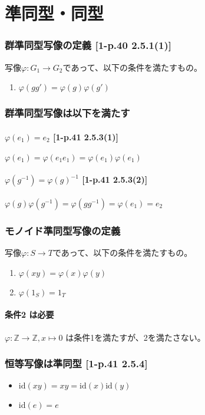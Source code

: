 \documentclass[twocolumn]{jsarticle}
\newcommand{\Z}{\mathbb{Z}}
\newcommand{\id}{\text{id}}
\newcommand{\inv}[1]{#1^{-1}}
\renewcommand{\phi}{\varphi}
\begin{document}
\newpage
\part*{準同型・同型}
\setcounter{section}{0}
\section{群準同型写像の定義 [1-p.40 2.5.1(1)]}
写像\(\phi\colon G_1 \to G_2\)であって、以下の条件を満たすもの。
\begin{enumerate}
    \item \(\phi(gg')=\phi(g)\phi(g')\)
\end{enumerate}

\section{群準同型写像は以下を満たす}
\subsection{\(\phi(e_1)=e_2\) [1-p.41 2.5.3(1)]}
\(\phi(e_1)=\phi(e_1e_1)=\phi(e_1)\phi(e_1)\)
\subsection{\(\phi(\inv{g})=\inv{\phi(g)}\) [1-p.41 2.5.3(2)]}
\(\phi(g)\phi(\inv{g})=\phi(g\inv{g})=\phi(e_1)=e_2\)

\section{モノイド準同型写像の定義}
写像\(\phi\colon S \to T\)であって、以下の条件を満たすもの。
\begin{enumerate}
    \item \(\phi(xy)=\phi(x)\phi(y)\)
    \item \(\phi(1_S)=1_T\)
\end{enumerate}
\subsection{条件2 は必要}
\(\phi\colon \Z \to \Z, x \mapsto 0\) は条件1を満たすが、2を満たさない。

\section{恒等写像は準同型 [1-p.41 2.5.4]}
\begin{itemize}
    \item \(\id(xy)=xy=\id(x)\id(y)\)
    \item \(\id(e)=e\)
\end{itemize}
\end{document}
